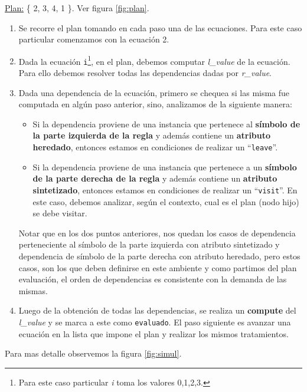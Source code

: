 \underline{Plan:} \{ 2, 3, 4, 1 \}. Ver figura \ref{fig:plan}.

\begin{enumerate}
\item Se recorre el plan tomando en cada paso una de las ecuaciones. Para este caso particular comenzamos con la ecuación 2.

\item Dada la ecuación \texttt{i}\footnote{Para este caso particular \textit{i} toma los valores 0,1,2,3.}, en el plan, debemos computar \textit{l\_value} de la ecuación. Para ello debemos resolver todas las dependencias dadas por \textit{r\_value}.

\item Dada una dependencia de la ecuación, primero se chequea si las misma fue computada en algún paso anterior, sino, analizamos de la siguiente manera:

\begin{itemize}
\item Si la dependencia proviene de una instancia que pertenece al \textbf{símbolo de la parte izquierda de la regla} y además contiene un \textbf{atributo heredado}, entonces estamos en condiciones de realizar un ``\texttt{leave}''.

\item Si la dependencia proviene de una instancia que pertenece a un \textbf{símbolo de la parte derecha de la regla} y además contiene un \textbf{atributo sintetizado}, entonces estamos en condiciones de realizar un ``\texttt{visit}''. En este caso, debemos analizar, según el contexto, cual es el plan (nodo hijo) se debe visitar. 
\end{itemize}

Notar que en los dos puntos anteriores, nos quedan los casos de dependencia perteneciente al símbolo de la parte izquierda con atributo sintetizado y dependencia de símbolo de la parte derecha con atributo heredado, pero estos casos, son los que deben definirse en este ambiente y como partimos del plan evaluación, el orden de dependencias es consistente con la demanda de las mismas.

\item Luego de la obtención de todas las dependencias, se realiza un \textbf{compute} del \textit{l\_value} y se marca a este como \texttt{evaluado}. El paso siguiente es avanzar una ecuación en la lista que impone el plan y realizar los mismos tratamientos.
\end{enumerate} 

Para mas detalle observemos la figura \ref{fig:simul}.

